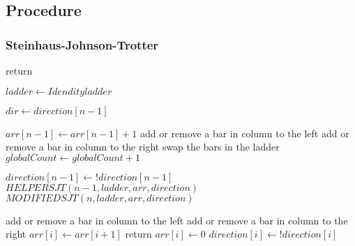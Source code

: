 \subsection{Procedure}

\subsubsection{Steinhaus-Johnson-Trotter}\pagebreak


\begin{algorithm}
  \begin{algorithmic}[1]

        \State return
      \EndIf

        \State $ladder \gets Idendity ladder$
      \EndIf

     
      \State $dir \gets direction[n-1]$

        
        \State $arr[n-1] \gets arr[n-1]+1$
          \State add or remove a bar in column to the left
          \Else
            \State add or remove a bar in column to the right
        \EndIf
          \State swap the bars in the ladder
         \EndIf
        \State $globalCount \gets globalCount+1$

      \EndFor
      \State $direction[n-1] \gets !direction[n-1]$
      \State $HELPERSJT(n-1, ladder, arr, direction)$
      \State $MODIFIEDSJT(n,  ladder, arr, direction)$

    \EndFunction
  \end{algorithmic}
\end{algorithm}

\begin{algorithm}
  \begin{algorithmic}[1]
            \State add or remove a bar in column to the left 
          \Else
            \State add or remove a bar in column to the right
          \EndIf
          \State $arr[i]\gets arr[i+1]$
          \State return
        \Else 
          \State $arr[i] \gets 0$
          \State $direction[i] \gets !direction[i]$
        \EndIf
      \EndFor
      \EndFunction
  \end{algorithmic}
\end{algorithm}

